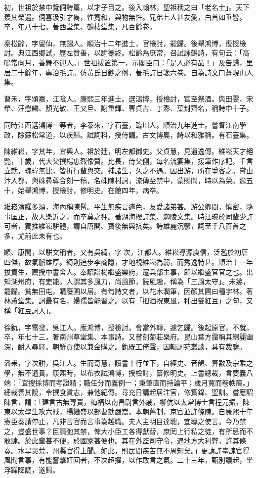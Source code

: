 \begin{pinyinscope}
初，世祖於禁中覽侗詩篇，以才子目之。後入翰林，聖祖稱之曰「老名士」。天下羨其榮遇。侗喜汲引才雋，性寬和，與物無忤。兄弟七人甚友愛，白首如垂髫。卒，年八十七。著西堂集、鶴棲堂集，凡百餘卷。

秦松齡，字留仙，無錫人。順治十二年進士，官檢討，罷歸。後舉鴻博，復授檢討。典江西鄉試，歷左贊善，以諭德終。松齡為庶常，召試詠鶴詩，有句云：「高鳴常向月，善舞不迎人。」世祖拔置第一，示閣臣曰：「是人必有品！」及告歸，里居二十餘年，專治毛詩。仿黃氏日鈔之例，著毛詩日箋六卷。自為詩文曰蒼峴山人集。

曹禾，字頌嘉，江陰人。康熙三年進士。選鴻博，授檢討，官至祭酒。與田雯、宋犖、汪懋麟、顏光敏、王又旦、謝重輝、曹貞吉、丁澎、葉封齊名，稱詩中十子。

同時江西選鴻博一等者，李泰來，字石臺，臨川人。順治九年進士。嘗督江南學政，除蘇松常道，以疾歸。試詞科，授侍講。古文博奧，詩以和雅稱。有石臺集。

陳維崧，字其年，宜興人。祖於廷，明左都御史。父貞慧，見遺逸傳。維崧天才絕艷，十歲，代大父撰楊忠烈像贊。比長，侍父側，每名流宴集，援筆作序記，千言立就，瑰瑋無比，皆折行輩與交。補諸生，久之不遇。因出游，所在爭客之。嘗由汴入都，與硃彞尊合刻一稿，名硃陳村詞，流傳至禁中，蒙賜問，時以為榮。逾五十，始舉鴻博，授檢討，修明史。在館四年，病卒。

維崧清臞多須，海內稱陳髯。平生無疾言遽色，友愛諸弟甚。游公卿間，慎密，隨事匡正，故人樂近之，而卒莫之狎。著湖海樓詩集、迦陵文集。時汪琬於同輩少許可者，獨推維崧駢體，謂自唐開、寶後無與抗矣。詩雄麗沉鬱，詞至千八百首之多，尤前此未有也。

順、康間，以駢文稱者，又有吳綺，字次，江都人。維崧導源庾信，泛濫於初唐四傑，故氣脈雄厚。綺則追步李商隱，才地視維崧為弱，而秀逸特甚。順治十一年拔貢生，薦授中書舍人。奉詔譜楊繼盛樂府，遷兵部主事，即以繼盛官官之也。出知湖州府，有吏能。人謂其多風力，尚風節，饒風趣，稱為「三風太守」。未幾，罷歸。貧無田屯，購廢圃以居。有匄詩文者，以花木潤筆，因顏其圃曰種字林。著林蕙堂集。詞最有名，婦孺皆能習之。以有「把酒祝東風，種出雙紅豆」之句，又稱「紅豆詞人」。

徐釚，字電發，吳江人。應鴻博，授檢討。會當外轉，遽乞歸。後起原官，不就。卒，年七十三。著南州草堂集、本事詩。又嘗刻菊莊樂府。昆山葉方靄稱其綿麗幽深，耐人尋繹。朝鮮貢使以兼金購之。釚既工倚聲，因輯詞苑叢談，具有裁鑒。

潘耒，字次耕，吳江人。生而奇慧，讀書十行並下，自經史、音韻、算數及宗乘之學，無不通貫。康熙時，以布衣試鴻博，授檢討，纂修明史。上書總裁，言要義八端：「宜搜採博而考證精；職任分而義例一；秉筆直而持論平；歲月寬而卷帙簡。」總裁善其說，令撰食貨志，兼他紀傳。尋充日講起居注官，修實錄、聖訓。嘗應詔陳言，謂：「建言古無專責，梅福以南昌尉言外戚，柳伉以太常博士言程元振，陳東以太學生攻六賊，楊繼盛以部曹劾嚴嵩。本朝舊制，京官並許條陳。自康熙十年憲臣奏請停止，凡非言官而言事為越職。夫人主明目達聰，宜導之使言。今乃禁之，豈盛世事？臣請弛其禁，俾大小臣工各得獻替，庶罔上行私之徒，有所忌而不敢肆。於此輩甚不便，於國家甚便也。其在外監司守令，遇地方大利弊，許其條奏。水旱災荒，州縣官得上聞。如此，則民間疾苦無不周知矣。」更請許臺諫官得風聞言事，有能奮擊奸回者，不次超擢，以作敢言之氣。二十三年，甄別議起，坐浮躁降調，遂歸。


\end{pinyinscope}
